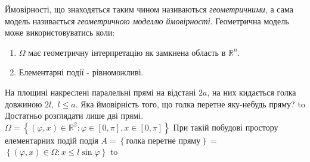 Ймовірності, що знаходяться таким чином називаються \emph{геометричними}, а сама модель 
називається \emph{геометричною моделлю ймовірності}.
\newline
Геометрична модель може використовуватись коли:
\begin{enumerate}
    \item $\Omega$ має геометричну інтерпретацію як замкнена область в $\mathbb{R}^n$.
    \item Елементарні події - рівноможливі.
\end{enumerate}
\begin{example}\label{buffon}
    На площині накреслені паралельні прямі на відстані $2a$, на них кидається 
    голка довжиною $2l,\; l \leq a $. Яка ймовірність того, що голка перетне 
    яку-небудь пряму?
    \newline
    \hbox to 
    Достатньо розглядати лише дві прямі. $\Omega = \left\{(\varphi, x)\in 
    \mathbb{R}^2: \varphi \in \left[0, \pi\right], x \in \left[0, \pi\right] 
    \right\}$
    \newline
    При такій побудові простору елементарних подій подія $A = \left\{\text{голка 
    перетне пряму}\right\} =$
    \newline
    $\left\{(\varphi, x)\in 
    \Omega: x\leq l\sin\varphi\right\}$
    \newline
    \hbox to \hsize{\hfil{
        \begin{tikzpicture}

\end{tikzpicture}}}
\end{example}
